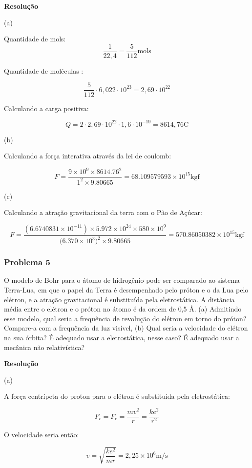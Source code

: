 \documentclass[a4paper, 12pt]{article}
\begin{document}
	\textbf{Resolução}
	
	(a)
	
	Quantidade de mols:
	\[
	\frac{1}{22,4}=\frac{5}{112} \text{mols}
	\]
	
	Quantidade de moléculas :
	
	\[
	\frac{5}{112}\cdot 6,022\cdot 10^{23}=2,69\cdot 10^{22}
	\]
	
	Calculando a carga positiva:
	
	\[
	Q=2\cdot 2,69\cdot 10^{22}\cdot 1,6\cdot 10^{-19}=8614,76\text{C}
	\]
	
	(b)
	
	Calculando a força interativa através da lei de coulomb:
	
	\[
	F=\frac{ 9 \times 1{0}^{ 9 } \times 8614.7{6}^{ 2 } }{ {1}^{ 2 } \times 9.80665 }=68.109579593 \times 1{0}^{ 15 }\text{kgf}
	\]
	
	(c)
	
	Calculando a atração gravitacional da terra com o Pão de Açúcar:
	
	\[
	F=\frac{ (6.6740831 \times 10^{-11}) \times 5.972 \times 1{0}^{ 24 } \times 580 \times 1{0}^{ 9 } }{  ( 6.370 \times 1{0}^{ 3 }{ ) }^{ 2 } \times 9.80665 }=570.86050382 \times 1{0}^{ 15 }\text{kgf}
	\]
	
	\subsubsection{Problema 5}
	
	O modelo de Bohr para o átomo de hidrogênio pode ser comparado ao sistema Terra-Lua, em que o papel da Terra é desempenhado pelo próton e o da Lua pelo elétron, e a atração gravitacional é substituída pela eletrostática. A distância média entre o elétron e o próton no átomo é da ordem de 0,5 Å. (a) Admitindo esse modelo, qual seria a frequência de revolução do elétron em torno do próton? Compare-a com a frequência da luz visível, (b) Qual seria a velocidade do elétron na sua órbita? É adequado usar a eletrostática, nesse caso? É adequado usar a mecânica não relativística?
	
	
	\textbf{Resolução}
	\par
	(a)
	
	A força centrípeta do proton para o elétron é substituida pela eletrostática:
	
	\[
	F_c=F_e=\frac{mv^2}{r}=\frac{ke^2}{r^2}
	\]
	
	O velocidade seria então:
	
	\[
	v=\sqrt{\frac{ke^2}{mr}}=2,25 \times 1{0}^{ 6 }\text{m/s}
	\]
	
\end{document}
